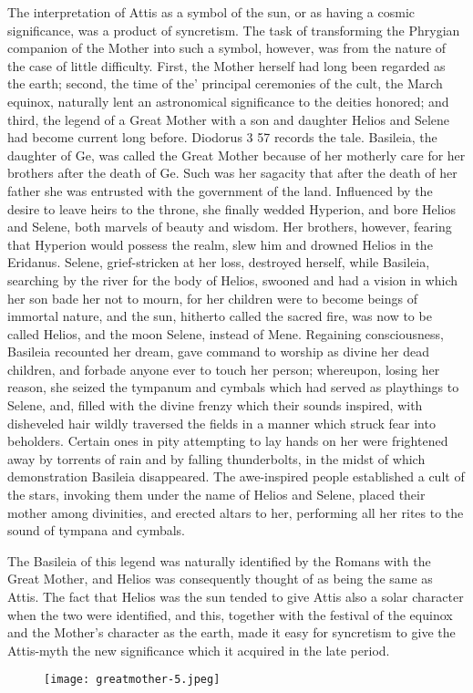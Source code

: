 \documentclass[a4paper, 11pt, oneside, polutonikogreek, english]{article}
\begin{document}
The interpretation of Attis as a symbol of the sun, or as having a cosmic significance, was a product of syncretism. The task of transforming the Phrygian companion of the Mother into such a symbol, however, was from the nature of the case of little difficulty. First, the Mother herself had long been regarded as the earth; second, the time of the' principal ceremonies of the cult, the March equinox, naturally lent an astronomical significance to the deities honored; and third, the legend of a Great Mother with a son and daughter Helios and Selene had become current long before. Diodorus 3 57 records the tale. Basileia, the daughter of Ge, was called the Great Mother because of her motherly care for her brothers after the death of Ge. Such was her sagacity that after the death of her father she was entrusted with the government of the land. Influenced by the desire to leave heirs to the throne, she finally wedded Hyperion, and bore Helios and Selene, both marvels of beauty and wisdom. Her brothers, however, fearing that Hyperion would possess the realm, slew him and drowned Helios in the Eridanus. Selene, grief-stricken at her loss, destroyed herself, while Basileia, searching by the river for the body of Helios, swooned and had a vision in which her son bade her not to mourn, for her children were to become beings of immortal nature, and the sun, hitherto called the sacred fire, was now to be called Helios, and the moon Selene, instead of Mene. Regaining consciousness, Basileia recounted her dream, gave command to worship as divine her dead children, and forbade anyone ever to touch her person; whereupon, losing her reason, she seized the tympanum and cymbals which had served as playthings to Selene, and, filled with the divine frenzy which their sounds inspired, with disheveled hair wildly traversed the fields in a manner which struck fear into beholders. Certain ones in pity attempting to lay hands on her were frightened away by torrents of rain and by falling thunderbolts, in the midst of which demonstration Basileia disappeared. The awe-inspired people established a cult of the stars, invoking them under the name of Helios and Selene, placed their mother among divinities, and erected altars to her, performing all her rites to the sound of tympana and cymbals.

The Basileia of this legend was naturally identified by the Romans with the Great Mother, and Helios was consequently thought of as being the same as Attis. The fact that Helios was the sun tended to give Attis also a solar character when the two were identified, and this, together with the festival of the equinox and the Mother's character as the earth, made it easy for syncretism to give the Attis-myth the new significance which it acquired in the late period.
\clearpage
\begin{landscape}
\begin{figure}[H]
\centering
\texttt{[image: greatmother-5.jpeg]}
\caption{}
\end{figure}
\end{landscape}
\clearpage
\end{document}
